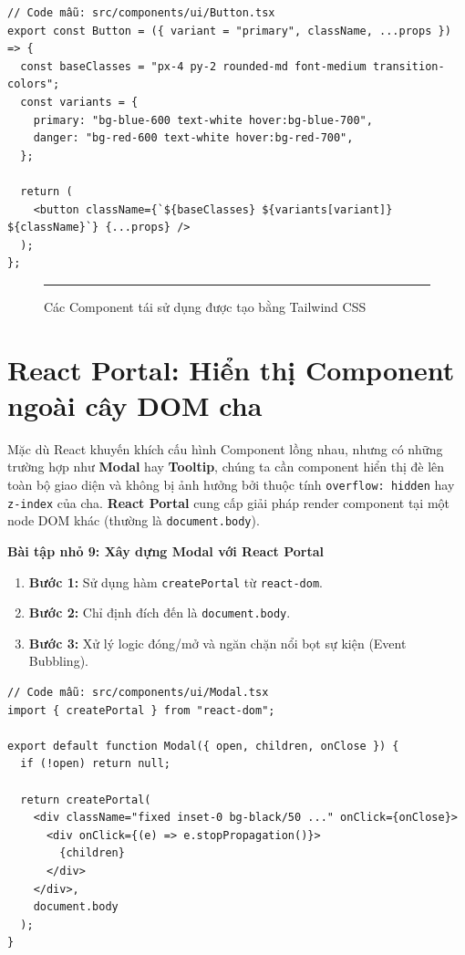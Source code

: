 \begin{Verbatim}
// Code mẫu: src/components/ui/Button.tsx
export const Button = ({ variant = "primary", className, ...props }) => {
  const baseClasses = "px-4 py-2 rounded-md font-medium transition-colors";
  const variants = {
    primary: "bg-blue-600 text-white hover:bg-blue-700",
    danger: "bg-red-600 text-white hover:bg-red-700",
  };

  return (
    <button className={`${baseClasses} ${variants[variant]} ${className}`} {...props} />
  );
};
\end{Verbatim}

\begin{figure}[H]
    \centering
    \rule{0.8\textwidth}{0.2\textwidth}
    \caption{Các Component tái sử dụng được tạo bằng Tailwind CSS}
\end{figure}

\section{React Portal: Hiển thị Component ngoài cây DOM cha}
Mặc dù React khuyến khích cấu hình Component lồng nhau, nhưng có những trường hợp như \textbf{Modal} hay \textbf{Tooltip}, chúng ta cần component hiển thị đè lên toàn bộ giao diện và không bị ảnh hưởng bởi thuộc tính \texttt{overflow: hidden} hay \texttt{z-index} của cha. \textbf{React Portal} cung cấp giải pháp render component tại một node DOM khác (thường là \texttt{document.body}).

\textbf{Bài tập nhỏ 9: Xây dựng Modal với React Portal}
\begin{enumerate}
    \item \textbf{Bước 1:} Sử dụng hàm \texttt{createPortal} từ \texttt{react-dom}.
    \item \textbf{Bước 2:} Chỉ định đích đến là \texttt{document.body}.
    \item \textbf{Bước 3:} Xử lý logic đóng/mở và ngăn chặn nổi bọt sự kiện (Event Bubbling).
\end{enumerate}

\begin{Verbatim}
// Code mẫu: src/components/ui/Modal.tsx
import { createPortal } from "react-dom";

export default function Modal({ open, children, onClose }) {
  if (!open) return null;

  return createPortal(
    <div className="fixed inset-0 bg-black/50 ..." onClick={onClose}>
      <div onClick={(e) => e.stopPropagation()}>
        {children}
      </div>
    </div>,
    document.body
  );
}
\end{Verbatim}

